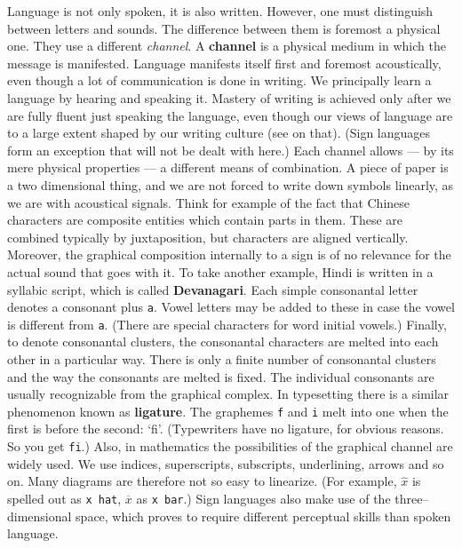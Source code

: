 Language is not only spoken, it is also written. However, one must
distinguish between letters and sounds. The difference between
them is foremost a physical one. They use a different {\it
channel}.
A \textbf{channel} is a physical medium in which the message is 
manifested. Language manifests itself first and foremost acoustically, 
even though a lot of communication is done in writing. We principally
learn a language by hearing and speaking it. Mastery of writing is
achieved only after we are fully fluent just speaking the language, 
even though our views of language are to a large extent shaped by 
our writing culture (see \cite{coulmas:writing} on that). (Sign 
languages form an exception that will not be dealt with here.) 
Each channel allows --- by its mere physical properties 
--- a different means of combination. A piece of paper is a two 
dimensional thing, and we are not forced to write down symbols 
linearly, as we are with acoustical signals. Think for example of 
the fact that Chinese characters are composite entities which contain 
parts in them. These are combined typically by juxtaposition, but 
characters are aligned vertically. Moreover, the graphical composition 
internally to a sign is of no relevance for the actual sound that goes 
with it. To take another example, Hindi is written in a syllabic
script, which
is called \textbf{Devanagari}. Each simple consonantal letter denotes
a consonant plus {\tt a}. Vowel letters may be added to these in
case the vowel is different from {\tt a}. (There are special
characters for word initial vowels.) Finally, to denote
consonantal clusters, the consonantal characters are melted into
each other in a particular way. There is only a finite number of
consonantal clusters and the way the consonants are melted is
fixed. The individual consonants are usually recognizable from the
graphical complex. In typesetting there is a similar phenomenon 
known as \textbf{ligature}. The graphemes {\tt f} and {\tt i} melt 
into one when the first is before the second: `fi'. (Typewriters 
have no ligature, for obvious reasons. So you get {\tt fi}.) Also, 
in mathematics the possibilities of the graphical channel are widely 
used. We use indices, superscripts, subscripts, underlining, arrows 
and so on. Many diagrams are therefore not so easy to linearize. 
(For example, $\widehat{x}$ is spelled out as {\tt x hat}, $\overline{x}$ 
as {\tt x bar}.) Sign languages also make use of the three--dimensional 
space, which proves to require different perceptual skills than 
spoken language. 

